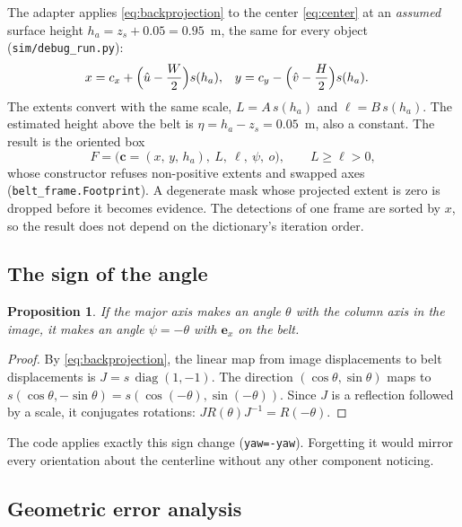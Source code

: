 \documentclass[11pt,a4paper]{article}
\newtheorem{proposition}{Proposition}
\theoremstyle{definition}
\theoremstyle{remark}
\newcommand{\ex}{\mathbf{e}_x}
\newcommand{\code}[1]{\texttt{#1}}
\begin{document}
The adapter applies \eqref{eq:backprojection} to the center \eqref{eq:center}
at an \emph{assumed} surface height $h_a = z_s + 0.05 = 0.95$~m, the same for
every object (\code{sim/debug\_run.py}):
\begin{align}
\label{eq:center-belt}
x &= c_x + \Bigl(\hat u - \frac W2\Bigr)s(h_a), &
y &= c_y - \Bigl(\hat v - \frac H2\Bigr)s(h_a).
\end{align}
The extents convert with the same scale, $L = A\,s(h_a)$ and $\ell = B\,s(h_a)$.
The estimated height above the belt is $\eta = h_a - z_s = 0.05$~m, also a
constant. The result is the oriented box
\begin{equation}
F = \bigl(\mathbf{c} = (x,\,y,\,h_a),\ L,\ \ell,\ \psi,\ o\bigr),
\qquad L \ge \ell > 0,
\end{equation}
whose constructor refuses non-positive extents and swapped axes
(\code{belt\_frame.Footprint}). A degenerate mask whose projected extent is zero
is dropped before it becomes evidence. The detections of one frame are sorted
by $x$, so the result does not depend on the dictionary's iteration order.

\subsection{The sign of the angle}

\begin{proposition}
\label{prop:sign}
If the major axis makes an angle $\theta$ with the column axis in the image, it
makes an angle $\psi = -\theta$ with $\ex$ on the belt.
\end{proposition}
\begin{proof}
By \eqref{eq:backprojection}, the linear map from image displacements to belt
displacements is $J = s\,\operatorname{diag}(1,-1)$. The direction
$(\cos\theta,\sin\theta)$ maps to $s(\cos\theta, -\sin\theta) =
s(\cos(-\theta), \sin(-\theta))$. Since $J$ is a reflection followed by a scale,
it conjugates rotations: $J R(\theta) J^{-1} = R(-\theta)$.
\end{proof}

The code applies exactly this sign change (\code{yaw=-yaw}). Forgetting it would
mirror every orientation about the centerline without any other component
noticing.

\subsection{Geometric error analysis}
\label{sec:error}
\end{document}
